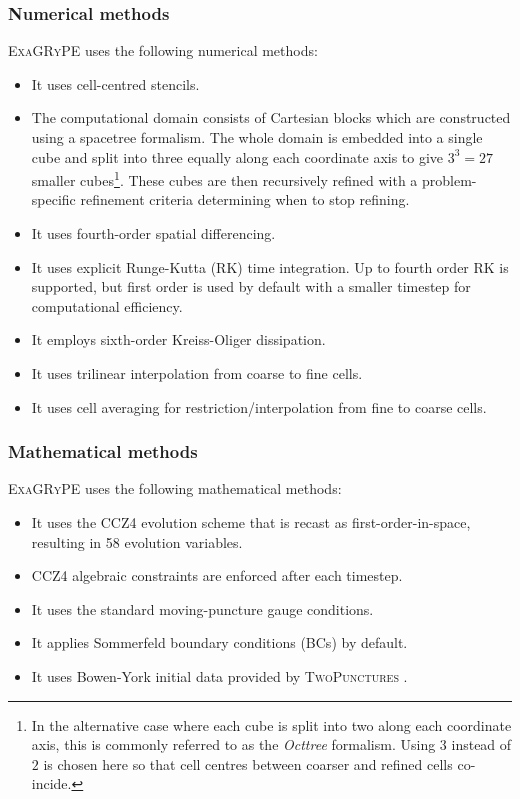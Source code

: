 \documentclass[12pt,a4paper]{article}
\numberwithin{figure}{subsection}
\newcommand{\exagrype}{\textsc{ExaGRyPE}\xspace}
\begin{document}
\subsubsection{Numerical methods}
\exagrype uses the following numerical methods:
\begin{itemize}
    \item It uses cell-centred stencils.
    \item The computational domain consists of Cartesian blocks which are
    constructed using a spacetree formalism. The whole domain is embedded into a
    single cube and split into three equally along each coordinate axis to give
    $3^3 = 27$ smaller cubes\footnote{In the alternative case where each cube is
    split into two along each coordinate axis, this is commonly referred to as
    the \emph{Octtree} formalism. Using $3$ instead of $2$ is chosen here so
    that cell centres between coarser and refined cells co-incide.}. These cubes
    are then recursively refined with a problem-specific refinement criteria
    determining when to stop refining.
    \item It uses fourth-order spatial differencing.
    \item It uses explicit Runge-Kutta (RK) time integration. Up to fourth order
    RK is supported, but first order is used by default with a smaller timestep
    for computational efficiency.
    \item It employs sixth-order Kreiss-Oliger dissipation.
    \item It uses trilinear interpolation from coarse to fine cells.
    \item It uses cell averaging for restriction/interpolation from fine to
    coarse cells.
\end{itemize}

\subsubsection{Mathematical methods}
\exagrype uses the following mathematical methods:
\begin{itemize}
    \item It uses the CCZ4 evolution scheme that is recast as
    first-order-in-space, resulting in 58 evolution variables.
    \item CCZ4 algebraic constraints are enforced after each timestep.
    \item It uses the standard moving-puncture gauge conditions.
    \item It applies Sommerfeld boundary conditions (BCs) by default.
    \item It uses Bowen-York initial data provided by \textsc{TwoPunctures}
    \cite{Ansorg:2004ds}.
\end{itemize}
\end{document}
